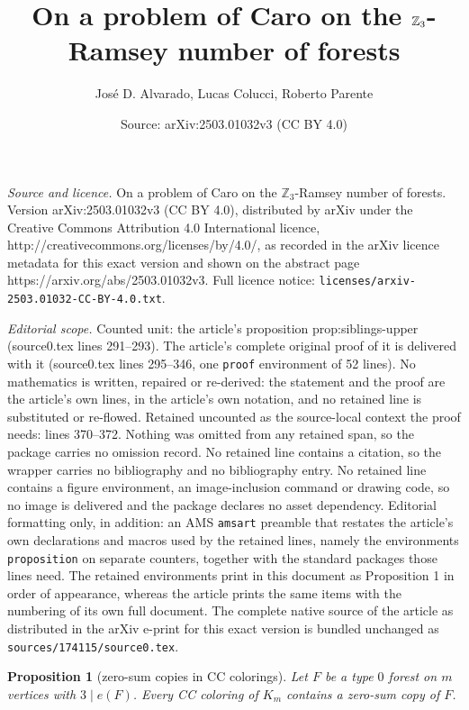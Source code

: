 \documentclass[10pt,a4paper]{amsart}
\title{On a problem of Caro on the $\Z_3$-Ramsey number of forests}
\author{Jos\'e D. Alvarado, Lucas Colucci, Roberto Parente}
\date{Source: arXiv:2503.01032v3 (CC BY 4.0)}
\newcommand{\Z}{\mathbb Z}
\newtheorem{proposition}{Proposition}
\begin{document}
\maketitle

\noindent\emph{Source and licence.} On a problem of Caro on the $\Z_3$-Ramsey number of forests. Version arXiv:2503.01032v3 (CC BY 4.0), distributed by arXiv under the Creative Commons Attribution 4.0 International licence, http://creativecommons.org/licenses/by/4.0/, as recorded in the arXiv licence metadata for this exact version and shown on the abstract page https://arxiv.org/abs/2503.01032v3. Full licence notice: \texttt{licenses/arxiv-2503.01032-CC-BY-4.0.txt}.\par\smallskip

\noindent\textit{Editorial scope.} Counted unit: the article's proposition prop:siblings-upper (source0.tex lines 291--293). The article's complete original proof of it is delivered with it (source0.tex lines 295--346, one \texttt{proof} environment of 52 lines). No mathematics is written, repaired or re-derived: the statement and the proof are the article's own lines, in the article's own notation, and no retained line is substituted or re-flowed.  Retained uncounted as the source-local context the proof needs: lines 370--372.  Nothing was omitted from any retained span, so the package carries no omission record.  No retained line contains a citation, so the wrapper carries no bibliography and no bibliography entry.  No retained line contains a figure environment, an image-inclusion command or drawing code, so no image is delivered and the package declares no asset dependency.  Editorial formatting only, in addition: an AMS \texttt{amsart} preamble that restates the article's own declarations and macros used by the retained lines, namely the environments \texttt{proposition} on separate counters, together with the standard packages those lines need.  The retained environments print in this document as Proposition 1 in order of appearance, whereas the article prints the same items with the numbering of its own full document.  The complete native source of the article as distributed in the arXiv e-print for this exact version is bundled unchanged as \texttt{sources/174115/source0.tex}.
\begin{proposition}[zero-sum copies in CC colorings]\label{prop:cc-copy}
Let $F$ be a type $0$ forest on $m$ vertices with $3\mid e(F)$. Every CC coloring of $K_m$ contains a zero-sum copy of $F$.
\end{proposition}
\end{document}
